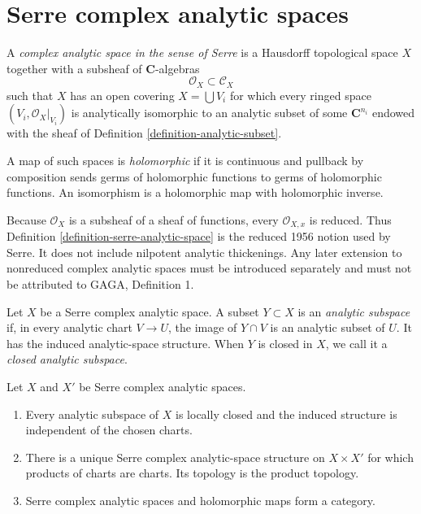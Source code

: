 \section{Serre complex analytic spaces}
\label{section-serre-analytic-spaces}

\begin{definition}
\label{definition-serre-analytic-space}
\begin{reference}
\cite[\S 1, no. 2, pp. 4--5]{GAGA}
\end{reference}
A {\it complex analytic space in the sense of Serre} is a Hausdorff
topological space $X$ together with a subsheaf of $\mathbf C$-algebras
$$
\mathcal O_X \subset \mathcal C_X
$$
such that $X$ has an open covering $X=\bigcup V_i$ for which every ringed
space $(V_i,\mathcal O_X|_{V_i})$ is analytically isomorphic to an analytic
subset of some $\mathbf C^{n_i}$ endowed with the sheaf of Definition
\ref{definition-analytic-subset}.

A map of such spaces is {\it holomorphic} if it is continuous and pullback
by composition sends germs of holomorphic functions to germs of holomorphic
functions. An isomorphism is a holomorphic map with holomorphic inverse.
\end{definition}

\begin{remark}
\label{remark-serre-analytic-spaces-reduced}
Because $\mathcal O_X$ is a subsheaf of a sheaf of functions, every
$\mathcal O_{X,x}$ is reduced. Thus Definition
\ref{definition-serre-analytic-space} is the reduced 1956 notion used by
Serre. It does not include nilpotent analytic thickenings. Any later extension
to nonreduced complex analytic spaces must be introduced separately and must
not be attributed to GAGA, Definition 1.
\end{remark}

\begin{definition}
\label{definition-analytic-subspace}
Let $X$ be a Serre complex analytic space. A subset $Y\subset X$ is an
{\it analytic subspace} if, in every analytic chart $V\to U$, the image of
$Y\cap V$ is an analytic subset of $U$. It has the induced analytic-space
structure. When $Y$ is closed in $X$, we call it a {\it closed analytic
subspace}.
\end{definition}

\begin{lemma}
\label{lemma-serre-analytic-subspaces-products}
\begin{reference}
\cite[\S 1, no. 2, p. 5]{GAGA}
\end{reference}
Let $X$ and $X'$ be Serre complex analytic spaces.
\begin{enumerate}
\item Every analytic subspace of $X$ is locally closed and the induced
structure is independent of the chosen charts.
\item There is a unique Serre complex analytic-space structure on
$X\times X'$ for which products of charts are charts. Its topology is the
product topology.
\item Serre complex analytic spaces and holomorphic maps form a category.
\end{enumerate}
\end{lemma}

